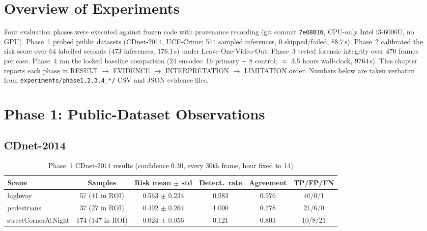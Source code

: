 \section{Overview of Experiments}

Four evaluation phases were executed against frozen code with provenance recording (git commit \texttt{7e08016}, CPU-only Intel i3-6006U, no GPU). Phase~1 probed public datasets (CDnet-2014, UCF-Crime; 514 sampled inferences, 0 skipped/failed, 88.7\,s). Phase~2 calibrated the risk score over 64 labelled seconds (473 inferences, 176.1\,s) under Leave-One-Video-Out. Phase~3 tested forensic integrity over 470 frames per case. Phase~4 ran the locked baseline comparison (24 encodes: 16 primary + 8 control; $\approx$ 3.5 hours wall-clock, 9764\,s). This chapter reports each phase in RESULT $\rightarrow$ EVIDENCE $\rightarrow$ INTERPRETATION $\rightarrow$ LIMITATION order. Numbers below are taken verbatim from \texttt{experiments/phase{1,2,3,4}\_*/} CSV and JSON evidence files.

\section{Phase 1: Public-Dataset Observations}

\subsection{CDnet-2014}

\begin{table}[H]
\centering
\caption{Phase~1 CDnet-2014 results (confidence 0.30, every 30th frame, hour fixed to 14)}
\label{tab:phase1-cdnet}
\begin{tabular}{|l|c|c|c|c|c|}
\hline
\textbf{Scene} & \textbf{Samples} & \textbf{Risk mean $\pm$ std} & \textbf{Detect.\ rate} & \textbf{Agreement} & \textbf{TP/FP/FN} \\
\hline
highway & 57 (41 in ROI) & 0.563 $\pm$ 0.234 & 0.983 & 0.976 & 40/0/1 \\
pedestrians & 37 (27 in ROI) & 0.492 $\pm$ 0.264 & 1.000 & 0.778 & 21/6/0 \\
streetCornerAtNight & 174 (147 in ROI) & 0.024 $\pm$ 0.056 & 0.121 & 0.803 & 10/8/21\footnotemark \\
\hline
\end{tabular}
\end{table}

